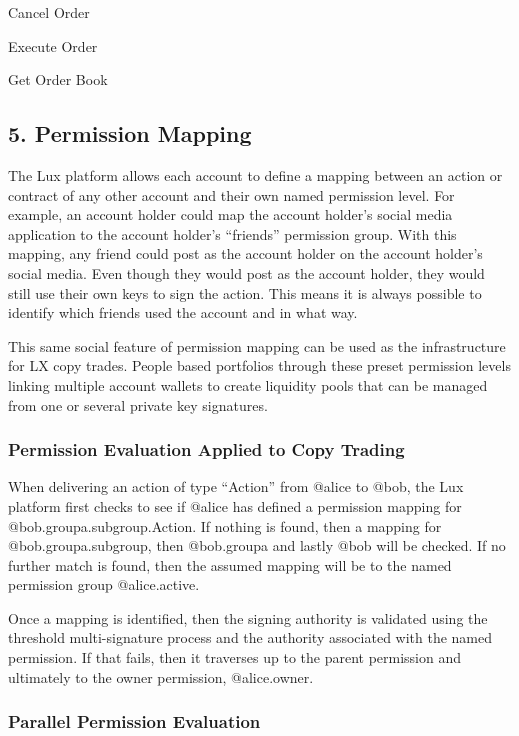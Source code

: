 \documentclass[11pt]{article}
\begin{document}
Cancel Order


Execute Order


Get Order Book


\subsection{5. Permission Mapping}

The Lux  platform allows each account to define a mapping between an action or contract of any other account and their own named permission level. For example, an account holder could map the account holder's social media application to the account holder's ``friends'' permission group. With this mapping, any friend could post as the account holder on the account holder's social media. Even though they would post as the account holder, they would still use their own keys to sign the action. This means it is always possible to identify which friends used the account and in what way.


This same social feature of permission mapping can be used as the infrastructure for LX copy trades. People based portfolios through these preset permission levels linking multiple account wallets to create liquidity pools that can be managed from one or several private key signatures.


\subsubsection{Permission Evaluation Applied to Copy Trading}

When delivering an action of type ``Action'' from @alice to @bob, the Lux  platform first checks to see if @alice has defined a permission mapping for @bob.groupa.subgroup.Action. If nothing is found, then a mapping for @bob.groupa.subgroup, then @bob.groupa and lastly @bob will be checked. If no further match is found, then the assumed mapping will be to the named permission group @alice.active.


Once a mapping is identified, then the signing authority is validated using the threshold multi-signature process and the authority associated with the named permission. If that fails, then it traverses up to the parent permission and ultimately to the owner permission, @alice.owner.


\subsubsection{Parallel Permission Evaluation}
\end{document}
